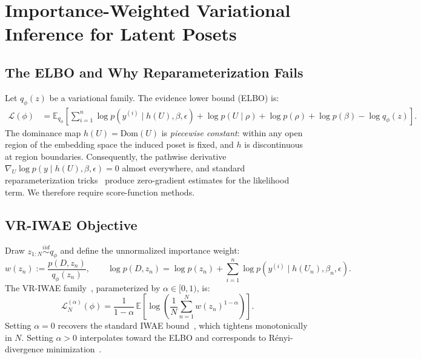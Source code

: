 \documentclass{article}
\theoremstyle{definition}
\theoremstyle{remark}
\newcommand{\E}{\mathbb{E}}
\newcommand{\Dom}{\mathrm{Dom}}
\providecommand{\coloneqq}{:=}
\begin{document}
\section{Importance-Weighted Variational Inference for Latent Posets}
\label{sec:vi}

\subsection{The ELBO and Why Reparameterization Fails}
\label{sec:elbo}
Let $q_\phi(z)$ be a variational family.
The evidence lower bound (ELBO) is:
\begin{align}
\mathcal{L}(\phi)
&= \E_{q_\phi}\!\left[
\sum_{i=1}^n \log p(y^{(i)}\mid h(U),\beta,\epsilon)
+ \log p(U\mid\rho) + \log p(\rho) + \log p(\beta)
- \log q_\phi(z)
\right].
\label{eq:elbo}
\end{align}
The dominance map $h(U)=\Dom(U)$ is \emph{piecewise constant}:
within any open region of the embedding space the induced poset is fixed,
and $h$ is discontinuous at region boundaries.
Consequently, the pathwise derivative
$\nabla_U\log p(y\mid h(U),\beta,\epsilon)=0$ almost everywhere,
and standard reparameterization
tricks~\citep{kingma2014vae,rezende2014stochastic} produce zero-gradient
estimates for the likelihood term.
We therefore require score-function methods.

\subsection{VR-IWAE Objective}
\label{sec:vr_iwae}
Draw $z_{1:N}\stackrel{iid}{\sim}q_\phi$ and define
the unnormalized importance weight:
\begin{equation}
w(z_n) \coloneqq \frac{p(D,z_n)}{q_\phi(z_n)},
\qquad
\log p(D,z_n)
= \log p(z_n) + \sum_{i=1}^n \log p(y^{(i)}\mid h(U_n),\beta_n,\epsilon).
\label{eq:log_weight}
\end{equation}
The VR-IWAE family~\citep{daudel2026importance}, parameterized by
$\alpha\in[0,1)$, is:
\begin{equation}
\mathcal{L}^{(\alpha)}_N(\phi)
= \frac{1}{1-\alpha}\,\E\!\left[
\log\!\left(\frac{1}{N}\sum_{n=1}^N w(z_n)^{1-\alpha}\right)
\right].
\label{eq:vr_iwae}
\end{equation}
Setting $\alpha=0$ recovers the standard IWAE
bound~\citep{burda2016iwae}, which tightens monotonically in $N$.
Setting $\alpha>0$ interpolates toward the ELBO and corresponds
to R\'{e}nyi-divergence
minimization~\citep{li2016renyi,daudel2026importance}.
\end{document}
